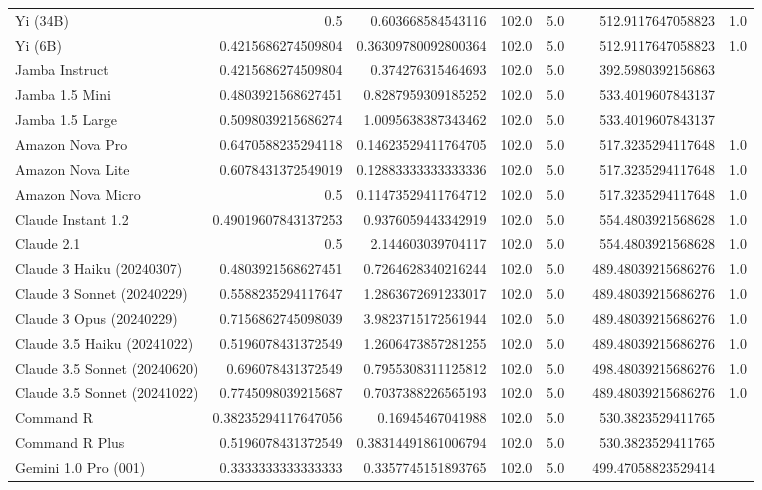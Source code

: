 \begin{table}[htp]
{\begin{tabular}{lrrrrrrr}
Yi (34B) & 0.5 & 0.603668584543116 & 102.0 & 5.0 &  & 512.9117647058823 & 1.0 \\
Yi (6B) & 0.4215686274509804 & 0.36309780092800364 & 102.0 & 5.0 &  & 512.9117647058823 & 1.0 \\
Jamba Instruct & 0.4215686274509804 & 0.374276315464693 & 102.0 & 5.0 &  & 392.5980392156863 &  \\
Jamba 1.5 Mini & 0.4803921568627451 & 0.8287959309185252 & 102.0 & 5.0 &  & 533.4019607843137 &  \\
Jamba 1.5 Large & 0.5098039215686274 & 1.0095638387343462 & 102.0 & 5.0 &  & 533.4019607843137 &  \\
Amazon Nova Pro & 0.6470588235294118 & 0.14623529411764705 & 102.0 & 5.0 &  & 517.3235294117648 & 1.0 \\
Amazon Nova Lite & 0.6078431372549019 & 0.12883333333333336 & 102.0 & 5.0 &  & 517.3235294117648 & 1.0 \\
Amazon Nova Micro & 0.5 & 0.11473529411764712 & 102.0 & 5.0 &  & 517.3235294117648 & 1.0 \\
Claude Instant 1.2 & 0.49019607843137253 & 0.9376059443342919 & 102.0 & 5.0 &  & 554.4803921568628 & 1.0 \\
Claude 2.1 & 0.5 & 2.144603039704117 & 102.0 & 5.0 &  & 554.4803921568628 & 1.0 \\
Claude 3 Haiku (20240307) & 0.4803921568627451 & 0.7264628340216244 & 102.0 & 5.0 &  & 489.48039215686276 & 1.0 \\
Claude 3 Sonnet (20240229) & 0.5588235294117647 & 1.2863672691233017 & 102.0 & 5.0 &  & 489.48039215686276 & 1.0 \\
Claude 3 Opus (20240229) & 0.7156862745098039 & 3.9823715172561944 & 102.0 & 5.0 &  & 489.48039215686276 & 1.0 \\
Claude 3.5 Haiku (20241022) & 0.5196078431372549 & 1.2606473857281255 & 102.0 & 5.0 &  & 489.48039215686276 & 1.0 \\
Claude 3.5 Sonnet (20240620) & 0.696078431372549 & 0.7955308311125812 & 102.0 & 5.0 &  & 498.48039215686276 & 1.0 \\
Claude 3.5 Sonnet (20241022) & 0.7745098039215687 & 0.7037388226565193 & 102.0 & 5.0 &  & 489.48039215686276 & 1.0 \\
Command R & 0.38235294117647056 & 0.16945467041988 & 102.0 & 5.0 &  & 530.3823529411765 &  \\
Command R Plus & 0.5196078431372549 & 0.38314491861006794 & 102.0 & 5.0 &  & 530.3823529411765 &  \\
Gemini 1.0 Pro (001) & 0.3333333333333333 & 0.3357745151893765 & 102.0 & 5.0 &  & 499.47058823529414 &  \\

\end{tabular}}
\end{table}
